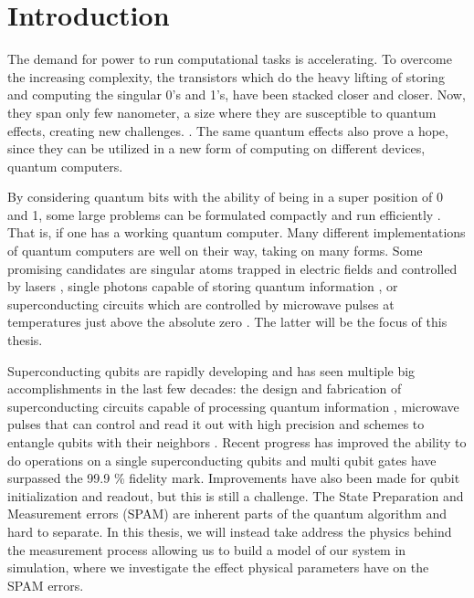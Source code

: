 \chapter{Introduction}\label{chap:Introduction}
The demand for power to run computational tasks is accelerating. To overcome the increasing complexity, the transistors which do the heavy lifting of storing and computing the singular 0's and 1's, have been stacked closer and closer. Now, they span only few nanometer, a size where they are susceptible to quantum effects, creating new challenges. \cite{morton_embracing_2011}. The same quantum effects also prove a hope, since they can be utilized in a new form of computing on different devices, quantum computers. 

By considering quantum bits with the ability of being in a super position of 0 and 1, some large problems can be formulated compactly and run efficiently \cite{preskill_quantum_2018}. That is, if one has a working quantum computer. Many different implementations of quantum computers are well on their way, taking on many forms. Some promising candidates are  singular atoms trapped in electric fields and controlled by lasers \cite{brown_co-designing_2016}, single photons capable of storing quantum information \cite{obrien_optical_2007}, or superconducting circuits which are controlled by microwave pulses at temperatures just above the absolute zero \cite{krantz_quantum_2019}. The latter will be the focus of this thesis. 

Superconducting qubits are rapidly developing and has seen multiple big accomplishments in the last few decades: the design and fabrication of superconducting circuits capable of processing quantum information \cite{koch_charge_2007, manucharyan_fluxonium_2009}, microwave pulses that can control and read it out with high precision \cite{motzoi_simple_2009, walter_rapid_2017} and schemes to entangle qubits with their neighbors \cite{yan_tunable_2018}. Recent progress has improved the ability to do operations on a single superconducting qubits \cite{barends_superconducting_2014} and multi qubit gates have surpassed the 99.9 \% fidelity mark\cite{ding_high-fidelity_2023}. Improvements have also been made for qubit initialization and readout\cite{walter_rapid_2017, swiadek_enhancing_2023}, but this is still a challenge. The State Preparation and Measurement errors (SPAM) are inherent parts of the quantum algorithm and hard to separate\cite{Lin_SPAM}. In this thesis, we will instead take address the physics behind the measurement process allowing us to build a model of our system in simulation, where we investigate the effect physical parameters have on the SPAM errors. 


